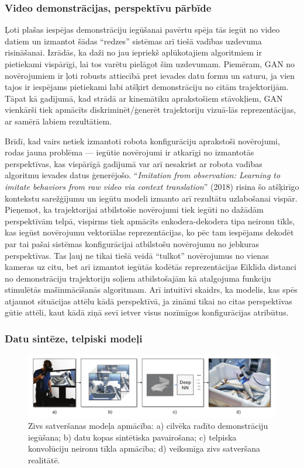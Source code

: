 \documentclass[12pt, a4paper]{article}
\numberwithin{equation}{section} %
\begin{document}
\subsubsection{Video demonstrācijas, perspektīvu pārbīde}

Ļoti plašas iespējas demonstrāciju iegūšanai pavērtu spēja tās iegūt no video datiem un izmantot šādas ``redzes'' sistēmas arī tiešā vadības uzdevuma risināšanai. Izrādās, ka daži no jau iepriekš aplūkotajiem algoritmiem ir pietiekami vispārīgi, lai tos varētu pielāgot šim uzdevumam. Piemēram, GAN no novērojumiem \cite{torabi2018generative} ir ļoti robusts attiecībā pret ievades datu formu un saturu, ja vien tajos ir iespējams pietiekami labi atšķirt demonstrāciju no citām trajektorijām. Tāpat kā gadījumā, kad strādā ar kinemātiku aprakstošiem stāvokļiem, GAN vienkārši tiek apmācīts diskriminēt/ģenerēt trajektoriju vizuā-lās reprezentācijas, ar samērā labiem rezultātiem.


Brīdī, kad vairs netiek izmantoti robota konfigurāciju aprakstoši novērojumi, rodas jauna problēma --- iegūtie novērojumi ir atkarīgi no izmantotās perspektīvas, kas vispārīgā gadījumā var arī nesakrist ar robota vadības algoritmu ievades datus ģenerējošo. ``\textit{Imitation from observation: Learning to imitate behaviors from raw video via context translation}'' \cite{liu2018imitation} (2018) risina šo atšķirīgo kontekstu sarežģījumu un iegūtu modeli izmanto arī rezultātu uzlabošanai vispār. Pieņemot, ka trajektorijai atbilstošie novērojumi tiek iegūti no dažādām perspektīvām telpā, vispirms tiek apmācīts enkodera-dekodera tipa neironu tīkls, kas iegūst novērojumu vektoriālas reprezentācijas, ko pēc tam iespējams dekodēt par tai pašai sistēmas konfigurācijai atbilstošu novērojumu no jebkuras perspektīvas. Tas ļauj ne tikai tiešā veidā ``tulkot'' novērojumus no vienas kameras uz citu, bet arī izmantot iegūtās kodētās reprezentācijas Eiklīda distanci no demonstrāciju trajektoriju soļiem atbilstošajām kā atalgojuma funkciju stimulētās mašīnmācīšanās algoritmam. Arī intuitīvi skaidrs, ka modelis, kas spēs atjaunot situācijas attēlu kādā perspektīvā, ja zināmi tikai no citas perspektīvas gūtie attēli, kaut kādā ziņā sevī ietver visus nozīmīgos konfigurācijas atribūtus.

\subsubsection{Datu sintēze, telpiski modeļi}

\begin{figure}[t!]
    \centering
    \includegraphics[width=16cm]{../img/fish.png}
    \caption{Zivs satveršanas modeļa apmācība: a) cilvēka radīto demonstrāciju iegūšana; b) datu kopas sintētiska pavairošana; c) telpiska konvolūciju neironu tīkla apmācība; d) veiksmīga zivs satveršana realitātē. \cite{dyrstad2018teaching}}
\end{figure}
\end{document}
